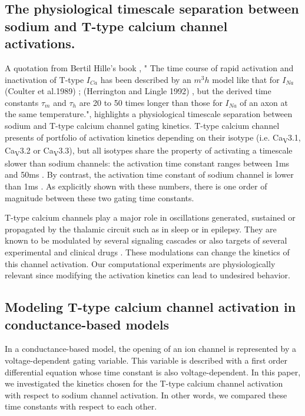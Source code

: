 \subsection{The physiological timescale separation between sodium and T-type calcium channel activations.}
A quotation from Bertil Hille’s book \citep{hille_ion_2001}, " The time course of rapid activation and inactivation of T-type $I_{Ca}$ has been described by an $m^3h$ model like that for $I_{Na}$ (Coulter et al.1989) \citep{coulter_calcium_1989} ; (Herrington and Lingle 1992) \citep{herrington_kinetic_1992}, but the derived time constants $\tau_m$ and $\tau_h$ are 20 to 50 times longer than those for $I_{Na}$ of an axon at the same temperature.", highlights a physiological timescale separation between sodium and T-type calcium channel gating kinetics. T-type calcium channel presents of portfolio of activation kinetics depending on their isotype (i.e. Ca\textsubscript{V}3.1, Ca\textsubscript{V}3.2 or Ca\textsubscript{V}3.3), but all isotypes share the property of activating a timescale slower than sodium channels: the activation time constant ranges between 1ms and 50ms  
\citep{klockner_comparison_1999,  cain_contributions_2010,  chemin_specific_2002,  clapham_international_2005,  perez-reyes_molecular_2003,  frazier_gating_2001, choi_altered_2015}. By contrast, the activation time constant of sodium channel is lower than 1ms  \citep{hodgkin_quantitative_1952,  gilly_fast_1997, reckziegel_electrophysiological_1998,  hille_ion_2001}. As explicitly shown with these numbers, there is one order of magnitude between these two gating time constants.

T-type calcium channels play a major role in oscillations generated, sustained or propagated by the thalamic circuit such as in sleep or in epilepsy. They are known to be modulated by several signaling cascades or also targets of several experimental and clinical drugs 
\citep{perez-reyes_molecular_2003,zamponi_physiology_2015, chen_role_2014,blesneac_phosphorylation_2015,lambert_modulation_2008,huc_regulation_2009, traboulsie_subunit-specific_2007}. These modulations can change the kinetics of this channel activation.  Our computational experiments are physiologically relevant since modifying the activation kinetics can lead to undesired behavior. 


\subsection{Modeling T-type calcium channel activation in conductance-based models}
In a conductance-based model, the opening of an ion channel is represented by a voltage-dependent gating variable. This variable is described with a first order differential equation whose time constant is also voltage-dependent. In this paper, we investigated the kinetics chosen for the T-type calcium channel activation with respect to sodium channel activation. In other words, we compared these time constants with respect to each other. 

